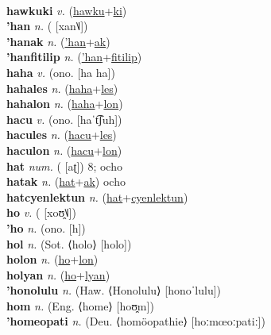  \label{hawkulon} \\
\textbf{hawkuki} \textit{v.} (\hyperref[hawku]{hawku}+\hyperref[ki]{ki})
 \label{hawkuki} \\
\textbf{'han} \textit{n.} ( [xan˥˩])
 \label{'han} \\
\textbf{'hanak} \textit{n.} (\hyperref['han]{'han}+\hyperref[ak]{ak})
 \label{'hanak} \\
\textbf{'hanfitilip} \textit{n.} (\hyperref['han]{'han}+\hyperref[fitilip]{fitilip})
 \label{'hanfitilip} \\
\textbf{haha} \textit{v.} (ono. [ha ha])
 \label{haha} \\
\textbf{hahales} \textit{n.} (\hyperref[haha]{haha}+\hyperref[les]{les})
 \label{hahales} \\
\textbf{hahalon} \textit{n.} (\hyperref[haha]{haha}+\hyperref[lon]{lon})
 \label{hahalon} \\
\textbf{hacu} \textit{v.} (ono. [haˈt͡ʃuh])
 \label{hacu} \\
\textbf{hacules} \textit{n.} (\hyperref[hacu]{hacu}+\hyperref[les]{les})
 \label{hacules} \\
\textbf{haculon} \textit{n.} (\hyperref[hacu]{hacu}+\hyperref[lon]{lon})
 \label{haculon} \\
\textbf{hat} \textit{num.} ( [aʈ])
8; ocho \label{hat} \\
\textbf{hatak} \textit{n.} (\hyperref[hat]{hat}+\hyperref[ak]{ak})
ocho \label{hatak} \\
\textbf{hatcyenlektun} \textit{n.} (\hyperref[hat]{hat}+\hyperref[cyenlektun]{cyenlektun})
 \label{hatcyenlektun} \\
\textbf{ho} \textit{v.} ( [xoʊ̯˥˩])
 \label{ho} \\
\textbf{'ho} \textit{n.} (ono. [h])
 \label{'ho} \\
\textbf{hol} \textit{n.} (Sot. ⟨holo⟩ [holo])
 \label{hol} \\
\textbf{holon} \textit{n.} (\hyperref[ho]{ho}+\hyperref[lon]{lon})
 \label{holon} \\
\textbf{holyan} \textit{n.} (\hyperref[ho]{ho}+\hyperref[lyan]{lyan})
 \label{holyan} \\
\textbf{'honolulu} \textit{n.} (Haw. ⟨Honolulu⟩ [honoˈlulu])
 \label{'honolulu} \\
\textbf{hom} \textit{n.} (Eng. ⟨home⟩ [hoʊ̯m])
 \label{hom} \\
\textbf{'homeopati} \textit{n.} (Deu. ⟨homöopathie⟩ [hoːmœoːpatiː])
 \label{'homeopati} \\
